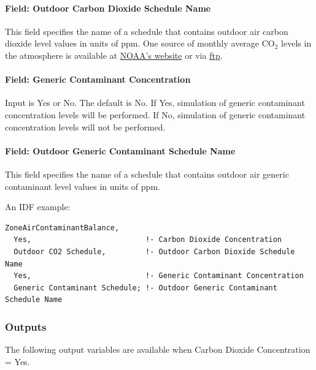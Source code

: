 \paragraph{Field: Outdoor Carbon Dioxide Schedule Name}\label{field-outdoor-carbon-dioxide-schedule-name}

This field specifies the name of a schedule that contains outdoor air carbon dioxide level values in units of ppm. One source of monthly average CO\(_{2}\) levels in the atmosphere is available at \href{http://www.esrl.noaa.gov/gmd/ccgg/trends/}{NOAA's website} or via \href{ftp://aftp.cmdl.noaa.gov/products/trends/co2/co2_mm_mlo.txt}{ftp}.

\paragraph{Field: Generic Contaminant Concentration}\label{field-generic-contaminant-concentration}

Input is Yes or No. The default is No. If Yes, simulation of generic contaminant concentration levels will be performed. If No, simulation of generic contaminant concentration levels will not be performed.

\paragraph{Field: Outdoor Generic Contaminant Schedule Name}\label{field-outdoor-generic-contaminant-schedule-name}

This field specifies the name of a schedule that contains outdoor air generic contaminant level values in units of ppm.

An IDF example:

\begin{lstlisting}
ZoneAirContaminantBalance,
  Yes,                          !- Carbon Dioxide Concentration
  Outdoor CO2 Schedule,         !- Outdoor Carbon Dioxide Schedule Name
  Yes,                          !- Generic Contaminant Concentration
  Generic Contaminant Schedule; !- Outdoor Generic Contaminant Schedule Name
\end{lstlisting}

\subsubsection{Outputs}\label{outputs-033}

The following output variables are available when Carbon Dioxide Concentration = Yes.

